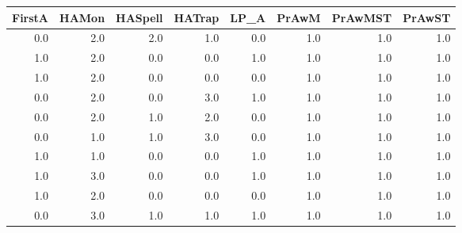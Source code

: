 \begin{tabular}{rrrrrrrr}
\toprule
 FirstA &  HAMon &  HASpell &  HATrap &  LP\_A &  PrAwM &  PrAwMST &  PrAwST \\
\midrule
    0.0 &    2.0 &      2.0 &     1.0 &   0.0 &    1.0 &      1.0 &     1.0 \\
    1.0 &    2.0 &      0.0 &     0.0 &   1.0 &    1.0 &      1.0 &     1.0 \\
    1.0 &    2.0 &      0.0 &     0.0 &   0.0 &    1.0 &      1.0 &     1.0 \\
    0.0 &    2.0 &      0.0 &     3.0 &   1.0 &    1.0 &      1.0 &     1.0 \\
    0.0 &    2.0 &      1.0 &     2.0 &   0.0 &    1.0 &      1.0 &     1.0 \\
    0.0 &    1.0 &      1.0 &     3.0 &   0.0 &    1.0 &      1.0 &     1.0 \\
    1.0 &    1.0 &      0.0 &     0.0 &   1.0 &    1.0 &      1.0 &     1.0 \\
    1.0 &    3.0 &      0.0 &     0.0 &   1.0 &    1.0 &      1.0 &     1.0 \\
    1.0 &    2.0 &      0.0 &     0.0 &   0.0 &    1.0 &      1.0 &     1.0 \\
    0.0 &    3.0 &      1.0 &     1.0 &   1.0 &    1.0 &      1.0 &     1.0 \\
\bottomrule
\end{tabular}
